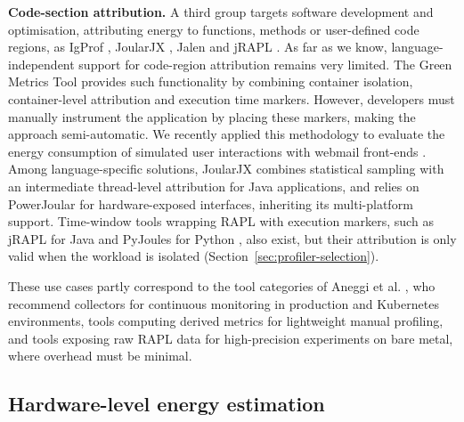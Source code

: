 \documentclass[
  acmsmall,
  screen,
  review,
  xcolor={dvipsnames,usenames}
]{acmart}
\begin{document}
\textbf{Code-section attribution.} A third group targets software development and optimisation, attributing energy to functions, methods or user-defined code regions, as IgProf \cite{khanEnergyProfilingUsing2015}, JoularJX \cite{noureddinePowerJoularJoularJXMultiPlatform2022}, Jalen \cite{noureddineMonitoringEnergyHotspots2015} and jRAPL \cite{liuDataOrientedCharacterizationApplicationLevel2015}. As far as we know, language-independent support for code-region attribution remains very limited. The Green Metrics Tool \cite{hoffmannGreenMetricsTool2025,DocsgreencodingioDocsPrologue} provides such functionality by combining container isolation, container-level attribution and execution time markers. However, developers must manually instrument the application by placing these markers, making the approach semi-automatic. We recently applied this methodology to evaluate the energy consumption of simulated user interactions with webmail front-ends \cite{kayembeExploringPrivacySecurity2025}. Among language-specific solutions, JoularJX \cite{noureddinePowerJoularJoularJXMultiPlatform2022} combines statistical sampling with an intermediate thread-level attribution for Java applications, and relies on PowerJoular for hardware-exposed interfaces, inheriting its multi-platform support. Time-window tools wrapping RAPL with execution markers, such as jRAPL for Java \cite{liuDataOrientedCharacterizationApplicationLevel2015} and PyJoules for Python \cite{jayExperimentalComparisonSoftwarebased2023,pathaniaCalculatingSoftwaresEnergy2025}, also exist, but their attribution is only valid when the workload is isolated (Section~\ref{sec:profiler-selection}).

These use cases partly correspond to the tool categories of Aneggi et al. \cite{aneggiMeasuringSoftwareEnergy2026}, who recommend collectors for continuous monitoring in production and Kubernetes environments, tools computing derived metrics for lightweight manual profiling, and tools exposing raw RAPL data for high-precision experiments on bare metal, where overhead must be minimal.

\subsection{Hardware-level energy estimation}
\end{document}
